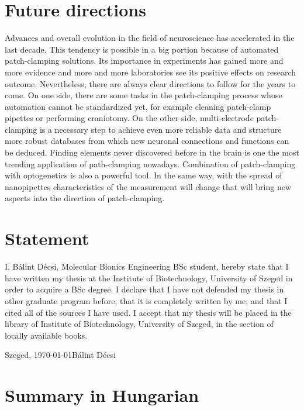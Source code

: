 \documentclass[12pt,a4paper]{report}
\begin{document}
\chapter{Future directions}
Advances and overall evolution in the field of neuroscience has accelerated in the last decade. This tendency is possible in a big portion because of automated patch-clamping solutions. Its importance in experiments has gained more and more evidence and more and more laboratories see its positive effects on research outcome. Nevertheless, there are always clear directions to follow for the years to come. On one side, there are some tasks in the patch-clamping process whose automation cannot be standardized yet, for example cleaning patch-clamp pipettes or performing craniotomy. On the other side, multi-electrode patch-clamping is a necessary step to achieve even more reliable data and structure more robust databases from which new neuronal connections and functions can be deduced. Finding elements never discovered before in the brain is one the most trending application of path-clamping nowadays. Combination of patch-clamping with optogenetics is also a powerful tool. In the same way, with the spread of nanopipettes characteristics of the measurement will change that will bring new aspects into the direction of patch-clamping.

\chapter*{Statement}

I, Bálint Décsi, Molecular Bionics Engineering BSc student, hereby state that I have written my thesis at the Institute of Biotechnology, University of Szeged in order to acquire a BSc degree. I declare that I have not defended my thesis in other graduate program before, that it is completely written by me, and that I cited all of the sources I have used. I accept that my thesis will be placed in the library of Institute of Biotechnology, University of Szeged, in the section of locally available books.

\vspace*{2cm}

Szeged, \today \hfill Bálint Décsi \hspace*{2cm}

\printbibliography

\appendix

\chapter{Summary in Hungarian}
\end{document}
